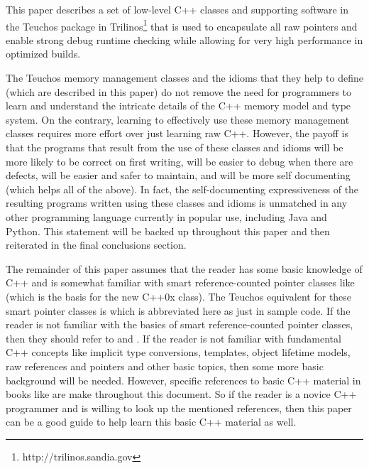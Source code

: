 \documentclass[pdf,ps2pdf,11pt]{SANDreport}
\begin{document}
This paper describes a set of low-level C++ classes and supporting
software in the Teuchos package in
Trilinos\footnote{http://trilinos.sandia.gov} that is used to
encapsulate all raw pointers and enable strong debug runtime checking
while allowing for very high performance in optimized builds.

The Teuchos memory management classes and the idioms that they help to
define (which are described in this paper) do not remove the need for
programmers to learn and understand the intricate details of the C++
memory model and type system.  On the contrary, learning to
effectively use these memory management classes requires more effort
over just learning raw C++.  However, the payoff is that the programs
that result from the use of these classes and idioms will be more
likely to be correct on first writing, will be easier to debug when
there are defects, will be easier and safer to maintain, and will be
more self documenting (which helps all of the above).  In fact, the
self-documenting expressiveness of the resulting programs written
using these classes and idioms is unmatched in any other programming
language currently in popular use, including Java and Python.  This
statement will be backed up throughout this paper and then reiterated
in the final conclusions section.

The remainder of this paper assumes that the reader has some basic
knowledge of C++ and is somewhat familiar with smart reference-counted
pointer classes like {} (which is the basis
for the new C++0x {} class).  The Teuchos
equivalent for these smart pointer classes is {}
which is abbreviated here as just {} in sample code.  If the
reader is not familiar with the basics of smart reference-counted
pointer classes, then they should refer to
{}\cite{RefCountPtrBeginnersGuide} and {}\cite{C++CodingStandards05}.
If the reader is not familiar with fundamental C++ concepts like
implicit type conversions, templates, object lifetime models, raw
references and pointers and other basic topics, then some more basic
background will be needed.  However, specific references to basic C++
material in books like {}\cite{EffectiveC++ThirdEdition, stroustrup97,
C++CodingStandards05} are make throughout this document.  So if the
reader is a novice C++ programmer and is willing to look up the
mentioned references, then this paper can be a good guide to help
learn this basic C++ material as well.
\end{document}
